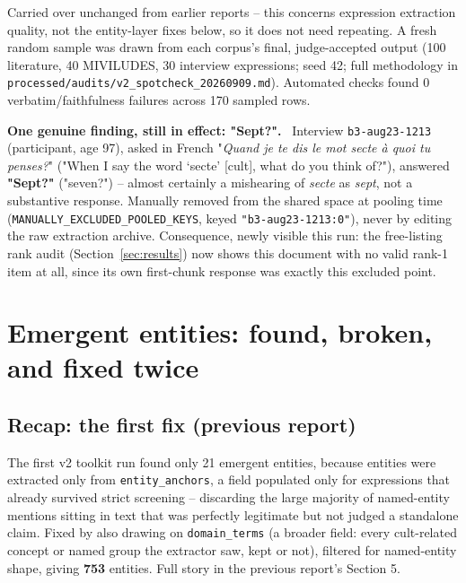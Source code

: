 \documentclass[11pt,a4paper]{article}
\newenvironment{plainbox}[1][Note]
  {\par\vspace{6pt}\noindent{\color{noteline}\rule{\linewidth}{0.6pt}}\par\vspace{3pt}
   \noindent\small\textbf{#1.}\ \ignorespaces}
  {\par\vspace{3pt}\noindent{\color{noteline}\rule{\linewidth}{0.6pt}}\vspace{6pt}\par}
\begin{document}
Carried over unchanged from earlier reports -- this concerns expression
extraction quality, not the entity-layer fixes below, so it does not
need repeating. A fresh random sample was drawn from each corpus's
final, judge-accepted output (100 literature, 40 MIVILUDES, 30 interview
expressions; seed 42; full methodology in
\texttt{processed/audits/v2\_spotcheck\_20260909.md}). Automated checks
found 0 verbatim/faithfulness failures across 170 sampled rows.

\begin{plainbox}[One genuine finding, still in effect: "Sept?"]
Interview \texttt{b3-aug23-1213} (participant, age 97), asked in French
"\emph{Quand je te dis le mot secte à quoi tu penses?}" ("When I say the
word `secte' [cult], what do you think of?"), answered \textbf{"Sept?"}
("seven?") -- almost certainly a mishearing of \emph{secte} as
\emph{sept}, not a substantive response. Manually removed from the
shared space at pooling time (\texttt{MANUALLY\_EXCLUDED\_POOLED\_KEYS},
keyed \texttt{"b3-aug23-1213:0"}), never by editing the raw extraction
archive. Consequence, newly visible this run: the free-listing rank
audit (Section~\ref{sec:results}) now shows this document with no valid
rank-1 item at all, since its own first-chunk response was exactly this
excluded point.
\end{plainbox}

\section{Emergent entities: found, broken, and fixed twice}
\label{sec:entities}

\subsection{Recap: the first fix (previous report)}
The first v2 toolkit run found only 21 emergent entities, because
entities were extracted only from \texttt{entity\_anchors}, a field
populated only for expressions that already survived strict screening --
discarding the large majority of named-entity mentions sitting in text
that was perfectly legitimate but not judged a standalone claim. Fixed
by also drawing on \texttt{domain\_terms} (a broader field: every
cult-related concept or named group the extractor saw, kept or not),
filtered for named-entity shape, giving \textbf{753} entities. Full
story in the previous report's Section 5.
\end{document}
